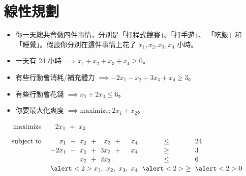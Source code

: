 \documentclass[standalone]{beamer}
\begin{document}
\section{線性規劃}

\begin{frame}{{\secname}}
  \begin{itemize}
    \itemsep=1ex
    \item 你一天總共會做四件事情，分別是「打程式競賽」、「打手遊」、
      「吃飯」和「睡覺」。假設你分別在這件事情上花了 $x_1, x_2, x_3, x_4$ 小時。
    \item 一天有 24 小時 $\implies x_1 + x_2 + x_3 + x_4 \geq 0$。
    \item 有些行動會消耗/補充體力 $\implies -2x_1 - x_2 + 3x_3 + x_4 \geq 3$。
    \item 有些行動會花錢 $\implies x_2 + 2x_3 \leq 6$。
    \item 你要最大化爽度 $\implies \text{maximize:}\ 2x_1 + x_2$。
  \end{itemize}
\pause
\end{frame}
\begin{frame}{{\secname}}
\begin{overlayarea}{\textwidth}{3cm}
   {
    \begin{equation*}
      \linearprog{2x_1 \ + \ x_2}{
        {
          \arraycolsep=3pt
          \begin{array}[t]{*4{rc}l}
            x_1 & + & x_2 & + & x_3 & + & x_4 & \leq & 24 \\
            -2x_1 & - & x_2 & + & 3x_3 & + & x_4 & \geq & 3 \\
            &   & x_2 & + & 2x_3 &   & & \leq & 6 \\
            \multicolumn{7}{r}{\alert<2>{x_1,\ x_2,\ x_3,\ x_4}} & \alert<2>{\geq} & \alert<2>{0} \\
          \end{array}
        }
      }
    \end{equation*}
  }
 
\end{overlayarea}
\end{frame}
\end{document}

